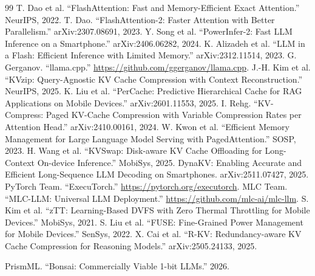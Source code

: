 \documentclass[sigconf, anonymous=false, screen=true, 10pt]{acmart}
\begin{document}
\begin{thebibliography}{99}
 T. Dao et al. ``FlashAttention: Fast and Memory-Efficient Exact Attention.'' NeurIPS, 2022.
 T. Dao. ``FlashAttention-2: Faster Attention with Better Parallelism.'' arXiv:2307.08691, 2023.
 Y. Song et al. ``PowerInfer-2: Fast LLM Inference on a Smartphone.'' arXiv:2406.06282, 2024.
 K. Alizadeh et al. ``LLM in a Flash: Efficient Inference with Limited Memory.'' arXiv:2312.11514, 2023.
 G. Gerganov. ``llama.cpp.'' \url{https://github.com/ggerganov/llama.cpp}.
 J.-H. Kim et al. ``KVzip: Query-Agnostic KV Cache Compression with Context Reconstruction.'' NeurIPS, 2025.
 K. Liu et al. ``PerCache: Predictive Hierarchical Cache for RAG Applications on Mobile Devices.'' arXiv:2601.11553, 2025.
 I. Rehg. ``KV-Compress: Paged KV-Cache Compression with Variable Compression Rates per Attention Head.'' arXiv:2410.00161, 2024.
 W. Kwon et al. ``Efficient Memory Management for Large Language Model Serving with PagedAttention.'' SOSP, 2023.
 H. Wang et al. ``KVSwap: Disk-aware KV Cache Offloading for Long-Context On-device Inference.'' MobiSys, 2025.
 DynaKV: Enabling Accurate and Efficient Long-Sequence LLM Decoding on Smartphones. arXiv:2511.07427, 2025.
 PyTorch Team. ``ExecuTorch.'' \url{https://pytorch.org/executorch}.
 MLC Team. ``MLC-LLM: Universal LLM Deployment.'' \url{https://github.com/mlc-ai/mlc-llm}.
 S. Kim et al. ``zTT: Learning-Based DVFS with Zero Thermal Throttling for Mobile Devices.'' MobiSys, 2021.
 S. Liu et al. ``FUSE: Fine-Grained Power Management for Mobile Devices.'' SenSys, 2022.
 X. Cai et al. ``R-KV: Redundancy-aware KV Cache Compression for Reasoning Models.'' arXiv:2505.24133, 2025.

 PrismML. ``Bonsai: Commercially Viable 1-bit LLMs.'' 2026.



\end{thebibliography}
\end{document}
